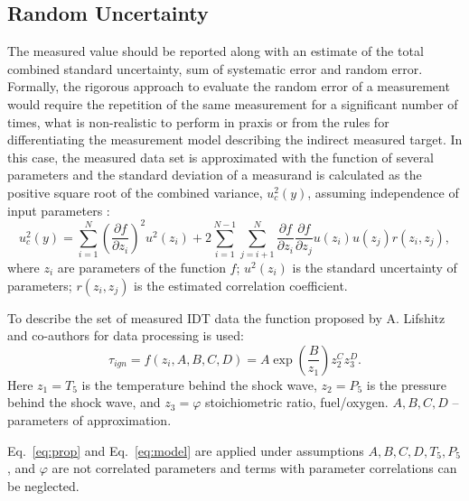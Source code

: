 \subsection{Random Uncertainty}

The measured value should be reported along with an estimate of the total combined standard uncertainty, sum of systematic error and random error. Formally, the rigorous approach to evaluate the random error of a measurement would require the repetition of the same measurement for a significant number of times, what is non-realistic to perform in praxis or from the rules for differentiating the measurement model describing the indirect measured target. In this case, the measured data set is approximated with the function of several parameters and the standard deviation of a measurand is calculated as the positive square root of the combined variance, $u_c^2(y)$, assuming independence of input parameters \cite{GUM2008}:
\begin{equation}
	\label{eq:prop}
	u_c^2(y) = \sum_{i=1}^{N} \left( \frac{\partial f}{\partial z_i} \right)^2 u^2(z_i) + 2 \sum_{i=1}^{N-1} \sum_{j=i+1}^{N} \frac{\partial f}{\partial z_i} \frac{\partial f}{\partial z_j} u(z_i) u(z_j) r(z_i, z_j),
\end{equation}
where $z_i$ are parameters of the function $f$; $u^2(z_i)$ is the standard uncertainty of parameters; $r(z_i, z_j)$ is the estimated correlation coefficient.

To describe the set of measured IDT data the function proposed by A. Lifshitz and co-authors for data processing is used\cite{Lifshitz1997}:
\begin{equation}
	\label{eq:model}
	\tau_{ign} = f(z_i, A, B, C, D) = A \exp \left( \frac{B}{z_1} \right) z_2^C z_3^D.
\end{equation}
Here $z_1 = T_5$ is the temperature behind the shock wave, $z_2 = P_5$ is the pressure behind the shock wave, and $z_3 = \varphi$ stoichiometric ratio, fuel/oxygen. $A, B, C, D$ -- parameters of approximation.


Eq.~\ref{eq:prop} and Eq.~\ref{eq:model} are applied under assumptions $A, B, C, D, T_5, P_5$, and $\varphi$ are not correlated parameters and terms with parameter correlations can be neglected.

